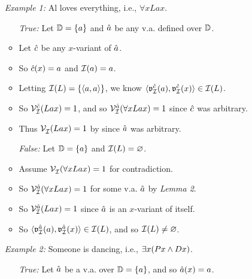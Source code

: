 \documentclass[a4paper, 11pt]{article} %
\begin{document}
\begin{itemize}
  \item[\it Example 1:] Al loves everything, i.e., $\forall xLax$.
    \begin{itemize}
      \item[\it True:] Let $\mathbb{D}=\lbrace a\rbrace$ and $\hat{a}$ be any v.a. defined over $\mathbb{D}$.
      \item Let $\hat{c}$ be any $x$-variant of $\hat{a}$.
      \item So $\hat{c}(x)=a$ and $\mathcal{I}(a)=a$.
      \item Letting $\mathcal{I}(L)=\lbrace\langle a,a\rangle\rbrace$, we know $\langle\mathfrak{v}_{\mathcal{I}}^{\hat{c}}(a),\mathfrak{v}_{\mathcal{I}}^{\hat{c}}(x)\rangle\in\mathcal{I}(L)$.
      \item So $\mathcal{V}_{\mathcal{I}}^{\hat{c}}(Lax)=1$, and so $\mathcal{V}_{\mathcal{I}}^{\hat{a}}(\forall xLax)=1$ since $\hat{c}$ was arbitrary.
      \item Thus $\mathcal{V}_{\mathcal{I}}^{}(Lax)=1$ by since $\hat{a}$ was arbitrary. 
      \item[\it False:] Let $\mathbb{D}=\lbrace a\rbrace$ and $\mathcal{I}(L)=\varnothing$.
      \item Assume $\mathcal{V}_{\mathcal{I}}^{}(\forall xLax)=1$ for contradiction. 
      \item So $\mathcal{V}_{\mathcal{I}}^{\hat{a}}(\forall xLax)=1$ for some v.a. $\hat{a}$ by \textit{Lemma 2}.
      \item So $\mathcal{V}_{\mathcal{I}}^{\hat{a}}(Lax)=1$ since $\hat{a}$ is an $x$-variant of itself.
      \item So $\langle\mathfrak{v}_{\mathcal{I}}^{\hat{a}}(a),\mathfrak{v}_{\mathcal{I}}^{\hat{a}}(x)\rangle\in\mathcal{I}(L)$, and so $\mathcal{I}(L)\neq\varnothing$.
    \end{itemize}
  \item[\it Example 2:] Someone is dancing, i.e., $\exists x(Px \wedge Dx)$.
    \begin{itemize}
      \item[\it True:] Let $\hat{a}$ be a v.a. over $\mathbb{D}=\lbrace a\rbrace$, and so $\hat{a}(x)=a$.

\end{itemize}
\end{itemize}
\end{document}
